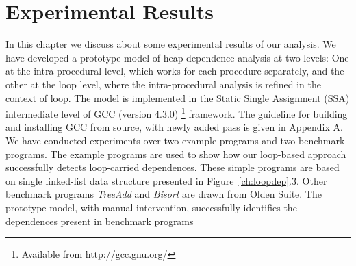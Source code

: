 \chapter{Experimental Results}
\label{ch:result}
In this chapter we discuss about some experimental results 
of our analysis. We have developed a prototype model of heap 
dependence analysis at two levels: One at the intra-procedural 
level, which works for each procedure separately, and the other 
at the loop level, where the intra-procedural analysis is refined 
in the context of loop. The model is implemented in the Static 
Single Assignment (SSA) intermediate level of GCC (version 4.3.0)
\footnote{Available from http://gcc.gnu.org/}  
framework. The guideline for building and installing GCC from source, with 
newly added pass is given in Appendix A. 
We have conducted experiments over two example programs 
and two benchmark programs. 
The example programs are used to show how our loop-based 
approach successfully detects loop-carried dependences. These 
simple programs are based on single linked-list data structure 
presented in Figure~\ref{ch:loopdep}.3. Other benchmark programs 
\emph{TreeAdd} and \emph{Bisort} are 
drawn from Olden Suite. The prototype model, with manual 
intervention, successfully 
identifies the dependences present in benchmark programs

